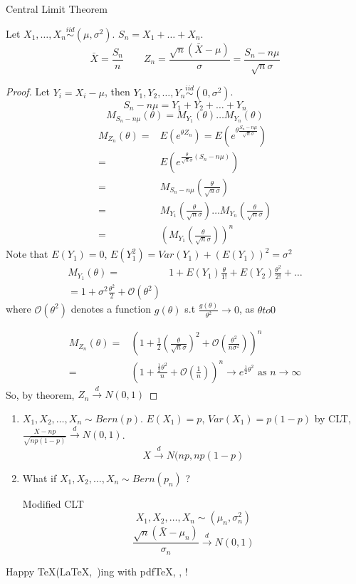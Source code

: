 \begin{theo}
Central Limit Theorem

Let $X_1,\dots,X_n \overset{iid}{\sim} (\mu,\sigma^2)$. $S_n=X_1+\dots+X_n$.
\[\bar{X}=\frac{S_n}{n} \qquad Z_n=\frac{\sqrt{n}(\bar{X}-\mu)}{\sigma}=\frac{S_n-n\mu}{\sqrt{n}\sigma}\]

\begin{proof}
Let $Y_i=X_i-\mu$, then $Y_1,Y_2,\dots,Y_n\overset{iid}{\sim} (0,\sigma^2)$.
\[S_n-n\mu=Y_1+Y_2+\dots+Y_n\]
\[M_{S_n-n\mu}(\theta)=M_{Y_1}(\theta)\dots M_{Y_n}(\theta)\]
\begin{align*}
M_{Z_n}(\theta)= & E(e^{\theta Z_n})=E\left(e^{\theta \frac{S_n-n\mu}{\sqrt{n}\sigma}} \right) \\
= & E\left(e^{\frac{\theta}{\sqrt{n}\sigma}(S_n-n\mu)} \right) \\
= & M_{S_n-n\mu} \left(\frac{\theta}{\sqrt{n}\sigma}\right) \\
= & M_{Y_1}\left(\frac{\theta}{\sqrt{n}\sigma}\right) \dots M_{Y_n}\left(\frac{\theta}{\sqrt{n}\sigma}\right)\\
= & \left(M_{Y_1}\left(\frac{\theta}{\sqrt{n}\sigma}\right)\right)^n
\end{align*}
Note that $E(Y_1)=0$, $E(Y_1^2)=Var(Y_1)+(E(Y_1))^2=\sigma^2$
\begin{align*}
M_{Y_1}(\theta) =& 1+ E(Y_1) \frac{\theta}{1!} + E(Y_2) \frac{\theta^2}{2!} +\dots \\
= 1+ \sigma^2 \frac{\theta^2}{2} + \mathcal{O}(\theta^2)
\end{align*}
where $\mathcal{O}(\theta^2)$ denotes a function $g(\theta)$ s.t $\frac{g(\theta)}{\theta^2}\to 0$, as $\theta to 0$

\begin{align*}
M_{Z_n}(\theta) =& \left(		1+\frac{1}{2}\left(\frac{\theta}{\sqrt{n}\sigma}\right)^2+\mathcal{O}\left(\frac{\theta^2}{n\sigma^2}\right)		\right)^n \\
= & \left(		1+\frac{\frac{1}{2}\theta^2}{n}+\mathcal{O}\left(\frac{1}{n}\right)		\right)^n \longrightarrow e^{\frac{1}{2}\theta^2} \text{ as } n\to\infty
\end{align*}
So, by theorem, $Z_n\overset{d}{\longrightarrow}N(0,1)$
\end{proof}
\end{theo}

\begin{enumerate}
\item $X_1,X_2,\dots,X_n \sim Bern(p)$. $E(X_1)=p$, $Var(X_1)=p(1-p)$
by CLT, $\frac{X-np}{\sqrt{np(1-p)}}\overset{d}{\longrightarrow}N(0,1)$.
\[X \overset{d}{\longrightarrow}N(np,np(1-p)\]
\item What if $X_1,X_2,\dots,X_n \sim Bern(p_n)$ ?

Modified CLT
\[X_1,X_2,\dots,X_n \sim (\mu_n,\sigma_n^2)\]
\[\frac{\sqrt{n}(\bar{X}-\mu_n)}{\sigma_n} \overset{d}{\longrightarrow} N(0,1)\]
\end{enumerate}

Happy \TeX(\LaTeX,~\LaTeXe)ing with pdf\TeX, \XeTeX, \LuaTeX!